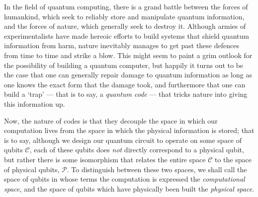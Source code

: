 \documentclass[twocolumn,showpacs,preprintnumbers,amsmath,amssymb,nofootinbib,pra,floatfix]{revtex4}
\begin{document}
In the field of quantum computing, there is a grand battle between the
forces of humankind, which seek to reliably store and manipulate
quantum information, and the forces of nature, which generally seek to
destroy it.  Although armies of experimentalists have made hereoic
efforts to build systems that shield quantum information from harm,
nature inevitably manages to get past these defences from time to time
and strike a blow.  This might seem to paint a grim outlook for the
possibility of building a quantum computer, but happily it turns out
to be the case that one can generally repair damage to quantum
information as long as one knows the exact form that the damage took,
and furthermore that one can build a `trap' --- that is to say, a
\emph{quantum code} --- that tricks nature into giving this
information up.

Now, the nature of codes is that they decouple the space in which our
computation lives from the space in which the physical information is
stored; that is to say, although we design our quantum circuit to
operate on some space of qubits $\mathscr{C}$, each of these qubits
does \emph{not} directly correspond to a physical qubit, but rather
there is some isomorphism that relates the entire space $\mathscr{C}$
to the space of physical qubits, $\mathscr{P}$.  To distinguish
between these two spaces, we shall call the space of qubits in whose
terms the computation is expressed the \emph{computational space}, and
the space of qubits which have physically been built the
\emph{physical space}.
\end{document}
